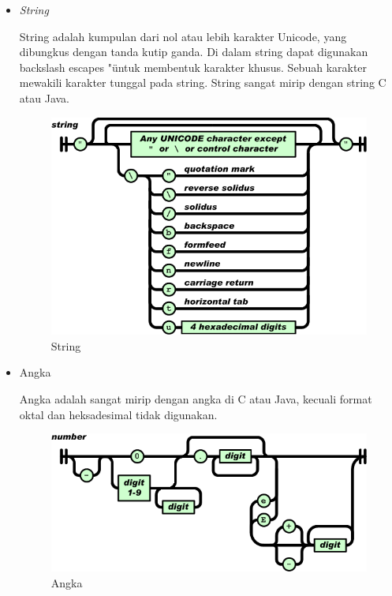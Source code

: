 \begin{itemize}
\item{\textit{String}}

String adalah kumpulan dari nol atau lebih karakter Unicode, yang dibungkus dengan tanda kutip ganda. Di dalam string dapat digunakan backslash escapes "\" untuk membentuk karakter khusus. Sebuah karakter mewakili karakter tunggal pada string. String sangat mirip dengan string C atau Java.

\begin{figure}[H]
	\centering		
	\includegraphics[scale=0.4]{Gambar/string.png}
	\caption[String]{String}
	\label{fig:string}	
\end{figure}

\item{Angka}

Angka adalah sangat mirip dengan angka di C atau Java, kecuali format oktal dan heksadesimal tidak digunakan.
\begin{figure}[H]
	\centering		
	\includegraphics[scale=0.4]{Gambar/number.png}
	\caption[Angka]{Angka}
	\label{fig:number}	
\end{figure}
\end{itemize}

